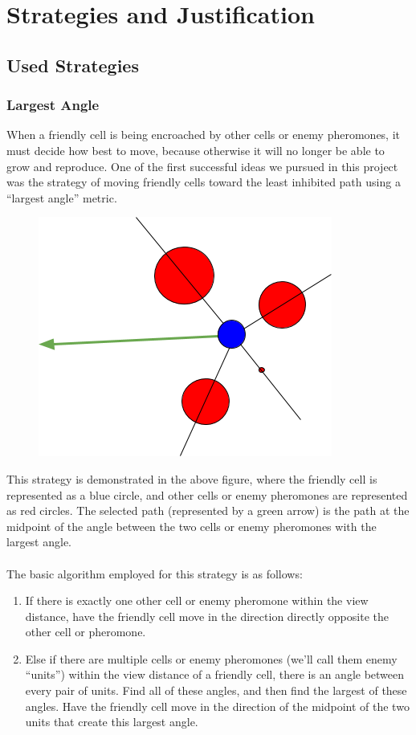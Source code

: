 \section{Strategies and Justification}
\subsection{Used Strategies}
\subsubsection{Largest Angle}
When a friendly cell is being encroached by other cells or enemy pheromones, it must decide how best to move, because otherwise it will no longer be able to grow and reproduce. One of the first successful ideas we pursued in this project was the strategy of moving friendly cells toward the least inhibited path using a “largest angle” metric.

\begin{figure}[h]
\center
\includegraphics[scale=1]{angle.png}
\caption{}
\label{fig:angle}
\end{figure}

This strategy is demonstrated in the above figure, where the friendly cell is represented as a blue circle, and other cells or enemy pheromones are represented as red circles. The selected path (represented by a green arrow) is the path at the midpoint of the angle between the two cells or enemy pheromones with the largest angle.
\\
\\

The basic algorithm employed for this strategy is as follows: \\
\begin{enumerate}
    \item If there is exactly one other cell or enemy pheromone within the view distance, have the friendly cell move in the direction directly opposite the other cell or pheromone.\\
    \item Else if there are multiple cells or enemy pheromones (we’ll call them enemy “units”) within the view distance of a friendly cell, there is an angle between every pair of units. Find all of these angles, and then find the largest of these angles. Have the friendly cell move in the direction of the midpoint of the two units that create this largest angle.
\end{enumerate}




